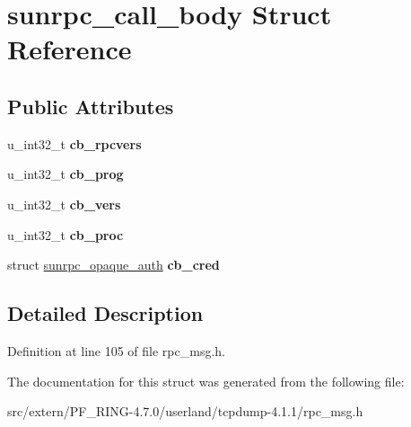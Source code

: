 \hypertarget{structsunrpc__call__body}{
\section{sunrpc\_\-call\_\-body Struct Reference}
\label{structsunrpc__call__body}
}
\subsection*{Public Attributes}
\begin{DoxyCompactItemize}
\item 
\hypertarget{structsunrpc__call__body_ab7ea113168c31594eff1720fdd75fdfd}{
u\_\-int32\_\-t {\bfseries cb\_\-rpcvers}}
\label{structsunrpc__call__body_ab7ea113168c31594eff1720fdd75fdfd}

\item 
\hypertarget{structsunrpc__call__body_ad882f8f3bfd2258bafdca441e970a77d}{
u\_\-int32\_\-t {\bfseries cb\_\-prog}}
\label{structsunrpc__call__body_ad882f8f3bfd2258bafdca441e970a77d}

\item 
\hypertarget{structsunrpc__call__body_a568bc1180c6432e2d9b34d74d46fbec6}{
u\_\-int32\_\-t {\bfseries cb\_\-vers}}
\label{structsunrpc__call__body_a568bc1180c6432e2d9b34d74d46fbec6}

\item 
\hypertarget{structsunrpc__call__body_a1ad9c591821b52a96035a5b44ad6f289}{
u\_\-int32\_\-t {\bfseries cb\_\-proc}}
\label{structsunrpc__call__body_a1ad9c591821b52a96035a5b44ad6f289}

\item 
\hypertarget{structsunrpc__call__body_a823fc11e8f35ec1ad6440899cca2a823}{
struct \hyperlink{structsunrpc__opaque__auth}{sunrpc\_\-opaque\_\-auth} {\bfseries cb\_\-cred}}
\label{structsunrpc__call__body_a823fc11e8f35ec1ad6440899cca2a823}

\end{DoxyCompactItemize}


\subsection{Detailed Description}


Definition at line 105 of file rpc\_\-msg.h.



The documentation for this struct was generated from the following file:\begin{DoxyCompactItemize}
\item 
src/extern/PF\_\-RING-\/4.7.0/userland/tcpdump-\/4.1.1/rpc\_\-msg.h\end{DoxyCompactItemize}
